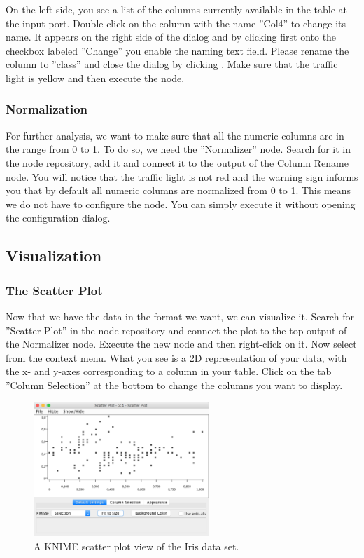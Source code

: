 On the left side, you see a list of the columns currently available in the table at the input port. Double-click on the column with the name ''Col4'' to change its name. It appears on the right side of the dialog and by clicking first onto the checkbox labeled ''Change'' you enable the naming text field. Please rename the column to ''class'' and close the dialog by clicking . Make sure that the traffic light is yellow and then execute the node.

\subsubsection{Normalization}
For further analysis, we want to make sure that all the numeric columns are in the range from 0 to 1. To do so, we need the ''Normalizer'' node. Search for it in the node repository, add it and connect it to the output of the Column Rename node. You will notice that the traffic light is not red and the warning sign informs you that by default all numeric columns are normalized from 0 to 1. This means we do not have to configure the node. You can simply execute it without opening the configuration dialog.


\subsection{Visualization}

\subsubsection{The Scatter Plot}

Now that we have the data in the format we want, we can visualize it. Search for ''Scatter Plot'' in the node repository and connect the plot to the top output of the Normalizer node. Execute the new node and then right-click on it. Now select  from the context menu. What you see is a 2D representation of your data, with the x- and y-axes corresponding to a column in your table. Click on the tab ''Column Selection'' at the bottom to change the columns you want to display.

\begin{figure}[h]
\centering
\includegraphics[width=0.59\textwidth]{graphics/knime_basics/scatter}
\caption{A KNIME scatter plot view of the Iris data set.}
\label{fig:scatter}
\end{figure}


